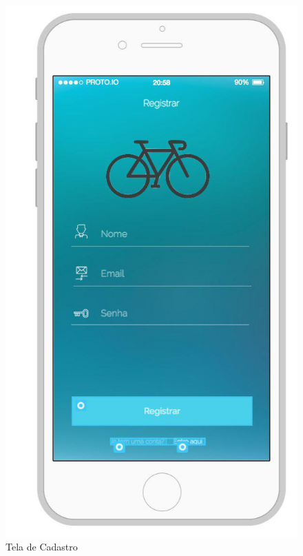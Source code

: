 \begin{figure}[!htb]
	\centering
	\includegraphics[scale=0.50]{tela_cadastro.jpg}
	\caption{Tela de Cadastro}
	\label{img:telacadastro}
\end{figure}

